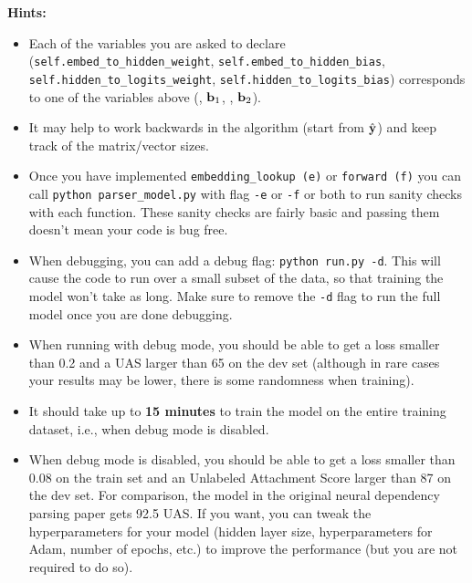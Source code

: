 \begin{parts}
\begin{enumerate}[label=\roman*.]
    \textbf{Hints:}
    \begin{itemize}
        \item Each of the variables you are asked to declare (\texttt{self.embed\_to\_hidden\_weight}, \newline \texttt{self.embed\_to\_hidden\_bias}, \texttt{self.hidden\_to\_logits\_weight}, \newline \texttt{self.hidden\_to\_logits\_bias}) corresponds to one of the variables above (\bW, $\mathbf{b}_1$, \bU, $\mathbf{b}_2$).  
        \item It may help to work backwards in the algorithm (start from $\hat{\mathbf{y}}$) and keep track of the matrix/vector sizes.  
        \item Once you have implemented \texttt{embedding\_lookup (e)} or \texttt{forward (f)} you can call \texttt{python parser\_model.py} with flag \texttt{-e} or \texttt{-f} or both to run sanity checks with each function. These sanity checks are fairly basic and passing them doesn't mean your code is bug free.
        \item
            When debugging, you can add a debug flag: \texttt{python run.py -d}. This will cause the code to run over a small subset of the data, so that training the model won't take as long. Make sure to remove the \texttt{-d} flag to run the full model once you are done debugging.

        \item
            When running with debug mode, you should be able to get a loss smaller than 0.2 and a UAS larger than 65 on the dev set (although in rare cases your results may be lower, there is some randomness when training).
        
        \item It should take up to \textbf{15 minutes} to train the model on the entire training dataset, i.e., when debug mode is disabled.
        
        \item When debug mode is disabled, you should be able to get a loss smaller than 0.08 on the train set and an Unlabeled Attachment Score larger than 87 on the dev set. For comparison, the model in the original neural dependency parsing paper gets 92.5 UAS. If you want, you can tweak the hyperparameters for your model (hidden layer size, hyperparameters for Adam, number of epochs, etc.) to improve the performance (but you are not required to do so).
    \end{itemize}
    

\end{enumerate}
\end{parts}
